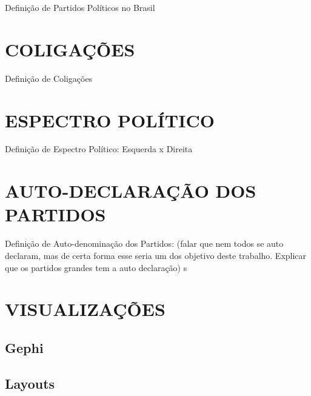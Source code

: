 Definição de Partidos Políticos no Brasil


\section{\texorpdfstring{\MakeUppercase{Coligações}}{}}
\label{secao_coligacoes}

Definição de Coligações





\section{\texorpdfstring{\MakeUppercase{Espectro Político}}{}}
\label{secao_espectro_politico}

Definição de Espectro Político: Esquerda x Direita


\section{\texorpdfstring{\MakeUppercase{Auto-declaração dos Partidos}}{}}
\label{secao_auto_declaracao_partidos}

Definição de Auto-denominação dos Partidos: (falar que nem todos se auto declaram, mas de certa forma esse seria um dos objetivo deste trabalho. Explicar que os partidos grandes tem a auto declaração)
s

\section{\texorpdfstring{\MakeUppercase{Visualizações}}{}}
\label{secao_visualizacoes}
\subsection{Gephi}
\label{visualizacoes--gephi}


\subsection{Layouts}
\label{visualizacoes--gephi}


